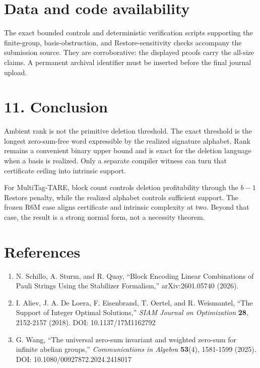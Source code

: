 \documentclass[
  11pt,
]{article}
\providecommand{\tightlist}{%
  \setlength{\itemsep}{0pt}\setlength{\parskip}{0pt}}
\begin{document}
\hypertarget{data-and-code-availability}{%
\section{Data and code availability}\label{data-and-code-availability}}

The exact bounded controls and deterministic verification scripts
supporting the finite-group, basis-obstruction, and Restore-sensitivity
checks accompany the submission source. They are corroborative: the
displayed proofs carry the all-size claims. A permanent archival
identifier must be inserted before the final journal upload.

\hypertarget{conclusion}{%
\section{11. Conclusion}\label{conclusion}}

Ambient rank is not the primitive deletion threshold. The exact
threshold is the longest zero-sum-free word expressible by the realized
signature alphabet. Rank remains a convenient binary upper bound and is
exact for the deletion language when a basis is realized. Only a
separate compiler witness can turn that certificate ceiling into
intrinsic support.

For MultiTag-TARE, block count controls deletion profitability through
the \(b-1\) Restore penalty, while the realized alphabet controls
sufficient support. The frozen R6M case aligns certificate and intrinsic
complexity at two. Beyond that case, the result is a strong normal form,
not a necessity theorem.

\hypertarget{references}{%
\section{References}\label{references}}

\begin{enumerate}
\def\labelenumi{\arabic{enumi}.}
\tightlist
\item
  N. Schillo, A. Sturm, and R. Quay, ``Block Encoding Linear
  Combinations of Pauli Strings Using the Stabilizer Formalism,''
  arXiv:2601.05740 (2026).
\item
  I. Aliev, J. A. De Loera, F. Eisenbrand, T. Oertel, and R. Weismantel,
  ``The Support of Integer Optimal Solutions,'' \emph{SIAM Journal on
  Optimization} \textbf{28}, 2152-2157 (2018). DOI: 10.1137/17M1162792
\item
  G. Wang, ``The universal zero-sum invariant and weighted zero-sum for
  infinite abelian groups,'' \emph{Communications in Algebra}
  \textbf{53}(4), 1581-1599 (2025). DOI: 10.1080/00927872.2024.2418017
\end{enumerate}
\end{document}

